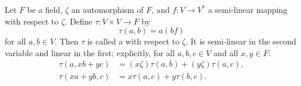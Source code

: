 Let $F$ be a field, $\zeta$ an automorphism of $F$, and $f \colon V \to V^*$ a semi-linear mapping with respect to $\zeta$. Define $\tau \colon V \times V \to F$ by
$$\tau(a, b) = a(bf)$$
for all $a, b \in V$. Then $\tau$ is called a  with respect to $\zeta$. It is semi-linear in the second variable and linear in the first; explicitly, for all $a, b, c \in V$ and all $x, y \in F$:
\begin{align*}
\tau(a, xb + yc) &= (x\zeta)\tau(a, b) + (y\zeta)\tau(a, c), \\
\tau(xa + yb, c) &= x\tau(a, c) + y\tau(b, c).
\end{align*}
